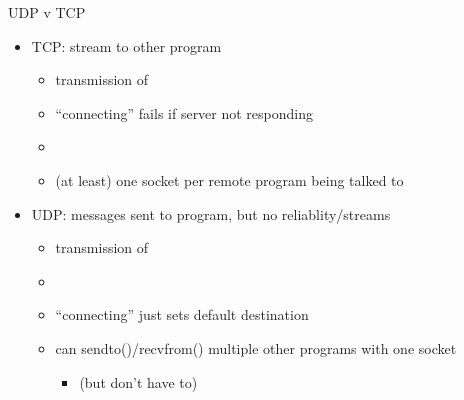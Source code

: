 \begin{frame}[fragile]{UDP v TCP}
    \begin{itemize}
    \item TCP: stream to other program
        \begin{itemize}
        \item {} transmission of 
        \item ``connecting'' fails if server not responding
        \item {}
        \item (at least) one socket per remote program being talked to
        \end{itemize}
    \item UDP: messages sent to program, but no reliablity/streams
        \begin{itemize}
        \item {} transmission of 
        \item {}
        \item ``connecting'' just sets default destination
        \item can sendto()/recvfrom() multiple other programs with one socket
            \begin{itemize}
                \item (but don't have to)
            \end{itemize}
        \end{itemize}
    \end{itemize}
\end{frame}
